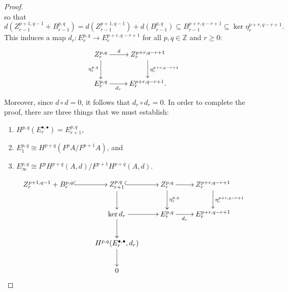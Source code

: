 \documentclass[11pt]{article}
\theoremstyle{thmstyle}
\theoremstyle{defstyle}
\newcommand{\Z}{\mathbb{Z}}
\renewcommand{\ge}{\geqslant}
\begin{document}
\begin{proof}
\begin{equation*}
    \end{equation*}
    so that 
    \begin{equation*}
        d\left(Z^{p + 1, q - 1}_{r - 1} + B^{p, q}_{r - 1}\right) = d\left(Z^{p + 1, q - 1}_{r - 1}\right) + d\left(B^{p, q}_{r - 1}\right)\subseteq B^{p + r, q - r + 1}_{r - 1}\subseteq \ker\eta^{p + r, q - r + 1}_r.
    \end{equation*}
    This induces a map $d_r\colon E^{p, q}_r\to E^{p + r, q - r + 1}_r$ for all $p,q\in\Z$ and $r\ge 0$:
    \begin{equation*}
        \xymatrix {
            Z^{p, q}_r\ar[r]^-d\ar[d]_{\eta^{p, q}_r} & Z^{p + r, q - r + 1}_r\ar[d]^{\eta^{p + r, q - r + 1}_r}\\
            E^{p, q}_r\ar[r]_-{d_r} & E^{p + r, q - r + 1}_r.
        }
    \end{equation*}
    Moreover, since $d\circ d = 0$, it follows that $d_r\circ d_r = 0$. In order to complete the proof, there are three things that we must establish: 
    \begin{enumerate}[label=(\Roman*)]
        \item $H^{p, q}(E^{\bullet,\bullet}_r) = E^{p, q}_{r + 1}$, 
        \item $E^{p, q}_1\cong H^{p + q}\left(F^pA/F^{p + 1}A\right)$, and 
        \item $E^{p, q}_\infty\cong F^pH^{p + q}(A, d)/F^{p + 1}H^{p + q}(A, d)$.
    \end{enumerate}

    \begin{equation*}
        \xymatrix {
            Z^{p + 1, q - 1}_r + B^{p, q}_r \ar@{^{(}->}[r] & Z^{p, q}_{r + 1}\ar@{^{(}->}[r]\ar[d] & Z^{p, q}_r\ar[r]\ar[d]^{\eta^{p, q}_r} & Z^{p + r, q - r + 1}_r\ar[d]^{\eta^{p + r, q - r + 1}_r}\\
            & \ker d_r\ar[r]\ar[d] &  E^{p, q}_r \ar[r]_-{d_r} & E^{p + r, q - r + 1}_r\\
            & H^{p, q}(E^{\bullet, \bullet}_r, d_r)\ar[d]\\
            & 0
        }
    \end{equation*}


\end{proof}
\end{document}
